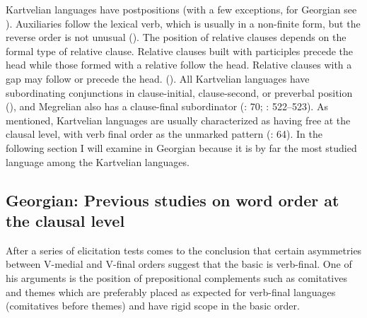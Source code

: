 \documentclass[output=paper,colorlinks,citecolor=brown,draftmode]{langscibook}
\begin{document}
Kartvelian languages have postpositions (with a few exceptions, for Georgian see \citealt{harris_word_2000}). Auxiliaries follow the lexical verb, which is usually in a non-finite form, but the reverse order is not unusual (\citealt{harris_word_2000}). The position of relative clauses depends on the formal type of relative clause. Relative clauses built with participles precede the head while those formed with a relative  follow the head. Relative clauses with a gap may follow or precede the head. (\citealt{harris_word_2000}). All Kartvelian languages have subordinating conjunctions in clause-initial, clause-second, or preverbal position (\citealt{boeder_modern_2021}), and Megrelian also has a clause-final subordinator (\citealt{boeder_south_2005}: 70; \citealt{testelets_kartvelian_2021}: 522--523).
As mentioned, Kartvelian languages are usually characterized as having free  at the clausal level, with verb final order as the unmarked pattern (\citealt{boeder_south_2005}: 64). In the following section I will examine  in Georgian because it is by far the most studied language among the Kartvelian languages. 

\subsection{Georgian: Previous studies on word order at the clausal level}\label{EC:ss:2.2}

After a series of elicitation tests \citet{skopeteas_georgian_2021} comes to the conclusion that certain asymmetries between V-medial and V-final orders suggest that the basic  is verb-final. One of his arguments is the position of prepositional complements such as comitatives and themes which are preferably placed as expected for verb-final languages (comitatives before themes) and have rigid scope in the basic order.
\end{document}
